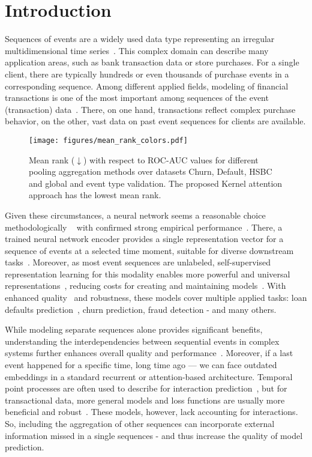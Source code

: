 \section{Introduction}

Sequences of events are a widely used data type representing an irregular multidimensional time series~\cite{yan2019recent}.
This complex domain can describe many application areas, such as bank transaction data or store purchases. 
For a single client, there are typically hundreds or even thousands of purchase events in a corresponding sequence.
Among different applied fields, modeling of financial transactions is one of the most important among sequences of the event (transaction) data~\cite{babaev2019rnn}.
There, on one hand, transactions reflect complex purchase behavior, on the other, vast data on past event sequences for clients are available.

\begin{figure}[!t]
     \centering
     \texttt{[image: figures/mean\_rank\_colors.pdf]}
     \caption{Mean rank ($\downarrow$) with respect to ROC-AUC values for different pooling aggregation methods over datasets Churn, Default, HSBC and global and event type validation. The proposed Kernel attention approach has the lowest mean rank.}
     \label{fig:mean_rank}
\end{figure}

Given these circumstances, a neural network seems a reasonable choice methodologically ~\cite{shchur2021neural} with confirmed strong empirical performance~\cite{babaev2019rnn}.
There, a trained neural network encoder provides a single representation vector for a sequence of events at a selected time moment, suitable for diverse downstream tasks~\cite{bin2022review}. 
Moreover, as most event sequences are unlabeled, self-supervised representation learning for this modality enables more powerful and universal representations~\cite{babaev2022coles},
reducing costs for creating and maintaining models~\cite{bazarova2024universal}. 
With enhanced quality~\cite{babaev2022coles} and robustness, these models cover multiple applied tasks: loan defaults prediction~\cite{zaytsev2023designing}, churn prediction, fraud detection - and many others.



While modeling separate sequences alone provides significant benefits, understanding the interdependencies between sequential events in complex systems further enhances overall quality and performance~\cite{farajtabar2017coevolve, farajtabar2014shaping}. 
Moreover, if a last event happened for a specific time, long time ago --- we can face outdated embeddings in a standard recurrent or attention-based architecture.
Temporal point processes are often used to describe for interaction prediction~\cite{de2016social, ijcai2021p623,passino2023mutually}, but for transactional data, more general models and loss functions are usually more beneficial and robust~\cite{zhuzhel2023continuous,bazarova2024universal}. 
These models, however, lack accounting for interactions.
So, including the aggregation of other sequences can incorporate external information missed in a single sequences - and thus increase the quality of model prediction.  

